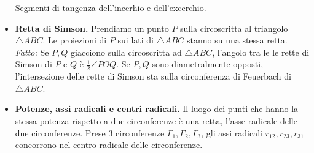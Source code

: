 \begin{itemize}
Segmenti di tangenza dell'incerhio e dell'excerchio.

\item \textbf{Retta di Simson.} Prendiamo un punto $P$ sulla circoscritta al triangolo $\triangle ABC$. Le proiezioni di $P$ sui lati di $\triangle ABC$ stanno su una stessa retta. \\
\textit{Fatto:} Se $P,Q$ giacciono sulla circoscritta ad $\triangle ABC$, l'angolo tra le le rette di Simson di $P$ e $Q$ è $\frac 12\angle POQ$. Se $P,Q$ sono diametralmente opposti, l'intersezione delle rette di Simson sta sulla circonferenza di Feuerbach di $\triangle ABC$.


\item \textbf{Potenze, assi radicali e centri radicali.} Il luogo dei punti che hanno la stessa potenza rispetto a due circonferenze è una retta, l'asse radicale delle due circonferenze. Prese $3$ circonferenze $\Gamma_1,\Gamma_2,\Gamma_3$, gli assi radicali $r_{12},r_{23},r_{31}$ concorrono nel centro radicale delle circonferenze.

\end{itemize}


